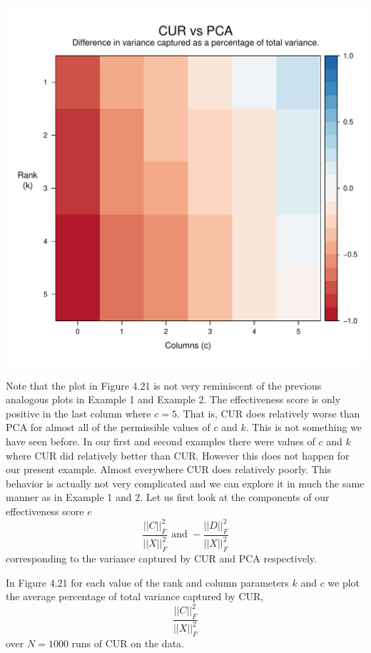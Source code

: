 \documentclass{book}
\begin{document}
\begin{center}
\includegraphics[scale=.63]{./Figures/cs_ex_1/raster.pdf}
\end{center}

Note that the plot in Figure 4.21 is not very reminiscent of the previous analogous plots in Example 1 and Example 2. The effectiveness score is only positive in the last column where $c=5$. That is, CUR does relatively worse than PCA for almost all of the permissible values of $c$ and $k$. This is not something we have seen before. In our first and second examples there were values of $c$ and $k$ where CUR did relatively better than CUR. However this does not happen for our present example. Almost everywhere CUR does relatively poorly. This behavior is actually not very complicated and we can explore it in much the same manner as in Example 1 and 2. Let us first look at the components of our effectiveness score $e$ 
$$
\frac{||C||_F^2}{||X||_F^2}\text{ and }-\frac{||D||_F^2}{||X||_F^2}
$$
corresponding to the variance captured by CUR and PCA respectively. 

In Figure 4.21 for each value of the rank and column parameters $k$ and $c$ we plot the average percentage of total variance captured by CUR,
$$
\frac{||C||_F^2}{||X||_F^2}
$$
over $N=1000$ runs of CUR on the data. 
\end{document}

